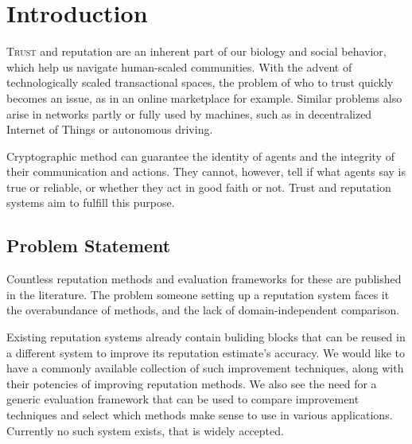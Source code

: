 \documentclass[%
    ]{\PathToTumTemplate/thesis/tum_thesis}
\begin{document}
\cleardoublepage
\mainmatter


\chapter{Introduction}
 

\lettrine{T}{rust} and reputation are an inherent part of our biology and social behavior, which help us navigate human-scaled communities.
With the advent of technologically scaled transactional spaces, the problem of who to trust quickly becomes an issue, as in an online marketplace for example.
Similar problems also arise in networks partly or fully used by machines, such as in decentralized Internet of Things or autonomous driving.

Cryptographic method can guarantee the identity of agents and the integrity of their communication and actions.
They cannot, however, tell if what agents say is true or reliable, or whether they act in good faith or not.
Trust and reputation systems aim to fulfill this purpose.



\section{Problem Statement}\label{sec:probstat}
Countless reputation methods and evaluation frameworks for these are published in the literature.
The problem someone setting up a reputation system faces it the overabundance of methods, and the lack of domain-independent comparison.

Existing reputation systems already contain buliding blocks that can be reused in a different system to improve its reputation estimate's accuracy.
We would like to have a commonly available collection of such improvement techniques, along with their potencies of improving reputation methods.
We also see the need for a generic evaluation framework that can be used to compare improvement techniques and select which methods make sense to use in various applications.
Currently no such system exists, that is widely accepted.
\end{document}
